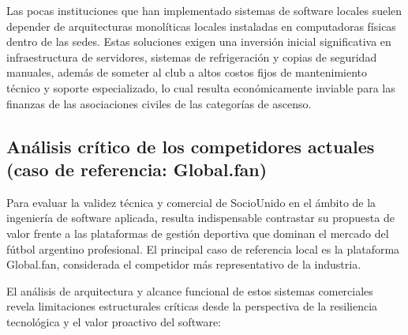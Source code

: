 \documentclass[conference, a4paper]{IEEEtran}
\begin{document}
Las pocas instituciones que han implementado sistemas de software locales suelen depender de arquitecturas monol\'iticas locales instaladas en computadoras f\'isicas dentro de las sedes. Estas soluciones exigen una inversi\'on inicial significativa en infraestructura de servidores, sistemas de refrigeraci\'on y copias de seguridad manuales, adem\'as de someter al club a altos costos fijos de mantenimiento t\'ecnico y soporte especializado, lo cual resulta econ\'omicamente inviable para las finanzas de las asociaciones civiles de las categor\'ias de ascenso.

\subsection{An\'alisis cr\'itico de los competidores actuales (caso de referencia: Global.fan)}
Para evaluar la validez t\'ecnica y comercial de SocioUnido en el \'ambito de la ingenier\'ia de software aplicada, resulta indispensable contrastar su propuesta de valor frente a las plataformas de gesti\'on deportiva que dominan el mercado del f\'utbol argentino profesional. El principal caso de referencia local es la plataforma Global.fan, considerada el competidor m\'as representativo de la industria.

El an\'alisis de arquitectura y alcance funcional de estos sistemas comerciales revela limitaciones estructurales cr\'iticas desde la perspectiva de la resiliencia tecnol\'ogica y el valor proactivo del software:
\end{document}
